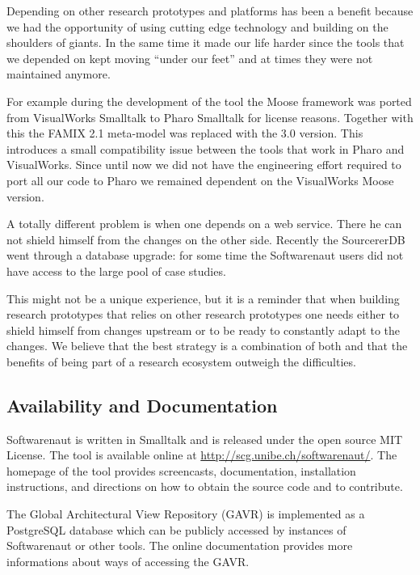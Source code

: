 \documentclass[preprint,12pt]{elsarticle}
\begin{document}
Depending on other research prototypes and platforms has been a benefit because we had the opportunity of using cutting edge technology and building on the shoulders of giants. In the same time it made our life harder since the tools that we depended on kept moving ``under our feet'' and at times they were not maintained anymore. 

For example during the development of the tool the Moose framework was ported from VisualWorks Smalltalk to Pharo Smalltalk for license reasons. Together with this the FAMIX 2.1 meta-model was replaced with the 3.0 version. This introduces a small compatibility issue between the tools that work in Pharo and VisualWorks. Since until now we did not have the engineering effort required to port all our code to Pharo we remained dependent on the VisualWorks Moose version. 

A totally different problem is when one depends on a web service. There he can not shield himself from the changes on the other side. Recently the SourcererDB went through a database upgrade: for some time the Softwarenaut users did not have access to the large pool of case studies.

This might not be a unique experience, but it is a reminder that when building research prototypes that relies on other research prototypes one needs either to shield himself from changes upstream or to be ready to constantly adapt to the changes. We believe that the best strategy is a combination of both and that the benefits of being part of a research ecosystem outweigh the difficulties.

\subsection {Availability and Documentation}

Softwarenaut is written in Smalltalk and is released under the open source MIT License. The tool is available online at {\footnotesize \url{http://scg.unibe.ch/softwarenaut/}}. The homepage of the tool provides screencasts, documentation, installation instructions, and directions on how to obtain the source code and to contribute.

The Global Architectural View Repository (GAVR) is implemented as a PostgreSQL database which can be publicly accessed by instances of Softwarenaut or other tools. The online documentation provides more informations about ways of accessing the GAVR. 
\end{document}
